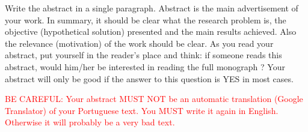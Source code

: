 Write the abstract in a single paragraph. Abstract is the main advertisement of your work. In summary, it should be clear what the research problem is, the objective (hypothetical solution) presented and the main results achieved. Also the relevance (motivation) of the work should be clear. As you read your abstract, put yourself in the reader's place and think: if someone reads this abstract, would him/her be interested in reading the full monograph ? Your abstract will only be good if the answer to this question is YES in most cases.

\textcolor{red}{BE CAREFUL: Your abstract MUST NOT be an automatic translation (Google Translator) of your Portuguese text. You MUST write it again in English. Otherwise it will probably be a very bad text.}

